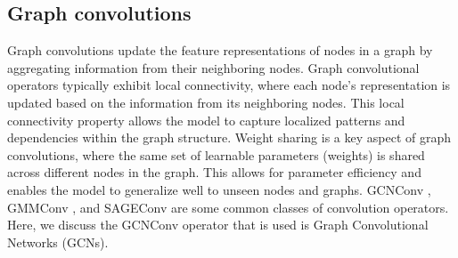 \subsection{Graph convolutions}
Graph convolutions update the feature representations of nodes in a graph by aggregating information from their neighboring nodes. Graph convolutional operators typically exhibit local connectivity, where each node's representation is updated based on the information from its neighboring nodes. This local connectivity property allows the model to capture localized patterns and dependencies within the graph structure. Weight sharing is a key aspect of graph convolutions, where the same set of learnable parameters (weights) is shared across different nodes in the graph. This allows for parameter efficiency and enables the model to generalize well to unseen nodes and graphs. GCNConv \cite{kipf}, GMMConv \cite{MoNet}, and SAGEConv \cite{SAGE} are some common classes of convolution operators. Here, we discuss the GCNConv operator that is used is Graph Convolutional Networks (GCNs).
